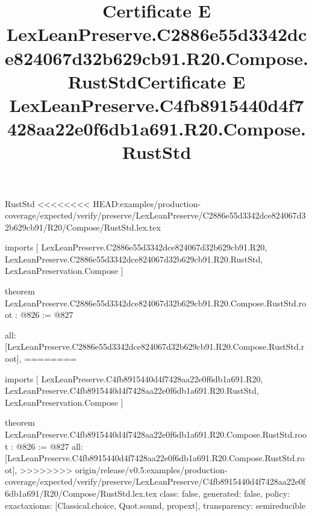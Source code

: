 \begin{lexlean}{RustStd}
<<<<<<<< HEAD:examples/production-coverage/expected/verify/preserve/LexLeanPreserve/C2886e55d3342dce824067d32b629cb91/R20/Compose/RustStd.lex.tex
\title{Certificate E LexLeanPreserve.C2886e55d3342dce824067d32b629cb91.R20.Compose.RustStd}
\begin{coremodule}
imports [
  LexLeanPreserve.C2886e55d3342dce824067d32b629cb91.R20,
  LexLeanPreserve.C2886e55d3342dce824067d32b629cb91.R20.RustStd,
  LexLeanPreservation.Compose
]

theorem LexLeanPreserve.C2886e55d3342dce824067d32b629cb91.R20.Compose.RustStd.root : @826 := @827 {
  all: [LexLeanPreserve.C2886e55d3342dce824067d32b629cb91.R20.Compose.RustStd.root],
========
\title{Certificate E LexLeanPreserve.C4fb8915440d4f7428aa22e0f6db1a691.R20.Compose.RustStd}
\begin{coremodule}
imports [
  LexLeanPreserve.C4fb8915440d4f7428aa22e0f6db1a691.R20,
  LexLeanPreserve.C4fb8915440d4f7428aa22e0f6db1a691.R20.RustStd,
  LexLeanPreservation.Compose
]

theorem LexLeanPreserve.C4fb8915440d4f7428aa22e0f6db1a691.R20.Compose.RustStd.root : @826 := @827 {
  all: [LexLeanPreserve.C4fb8915440d4f7428aa22e0f6db1a691.R20.Compose.RustStd.root],
>>>>>>>> origin/release/v0.5:examples/production-coverage/expected/verify/preserve/LexLeanPreserve/C4fb8915440d4f7428aa22e0f6db1a691/R20/Compose/RustStd.lex.tex
  class: false,
  generated: false,
  policy: exact{axioms: [Classical.choice, Quot.sound, propext]},
  transparency: semireducible
}


\end{coremodule}}
\end{coremodule}
\end{lexlean}
